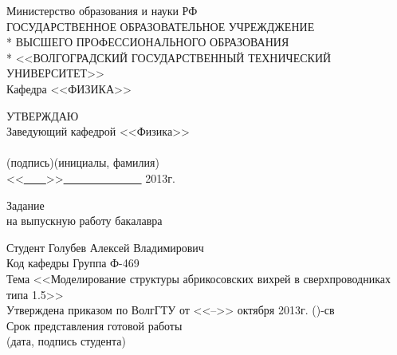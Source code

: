 \begin{titlepage}
	\begin{center}
		Министерство образования и науки РФ \\
		\vspace{.5cm}
		ГОСУДАРСТВЕННОЕ ОБРАЗОВАТЕЛЬНОЕ УЧРЕЖДЖЕНИЕ\\*
		ВЫСШЕГО ПРОФЕССИОНАЛЬНОГО ОБРАЗОВАНИЯ\\*
		<<ВОЛГОГРАДСКИЙ ГОСУДАРСТВЕННЫЙ ТЕХНИЧЕСКИЙ УНИВЕРСИТЕТ>>\\
		\vspace{.5cm}
		Кафедра <<ФИЗИКА>>
		\vspace{.5cm}
	\end{center}
\begin{flushright}
	УТВЕРЖДАЮ\\
	Заведующий кафедрой <<Физика>>\\
	\vspace{.3cm}
	\underline{\hspace{2cm}}\hspace{1cm}\underline{\hspace{4cm}}\\
	\vspace{-.2cm}\footnotesize(подпись)\hspace{1.8cm}(инициалы, фамилия)
		\hspace*{.2cm}\ \normalsize\\
	\vspace{.3cm}
	<<\underline{\ \ \ \ }>>\underline{\ \ \ \ \ \ \ \ \ \ \ \ \ \ } 2013г.
\end{flushright}
\begin{center}
	\large Задание \\
	\normalsize на выпускную работу бакалавра
\end{center}
\begin{flushleft}
Студент Голубев Алексей Владимирович\\
Код кафедры \underline{\hspace{3cm}}\hspace{6cm}Группа Ф-469\\
Тема <<Моделирование структуры абрикосовских вихрей в сверхпроводниках 
	типа 1.5>>\\
Утверждена приказом по ВолгГТУ от <<-->> октября 2013г. \No ()-св\\
Срок представления готовой работы \underline{\hspace{6cm}}\\
\vspace{-.2cm}\hspace{9.5cm}\footnotesize(дата, подпись студента)\normalsize\\

\end{flushleft}
\end{titlepage}
